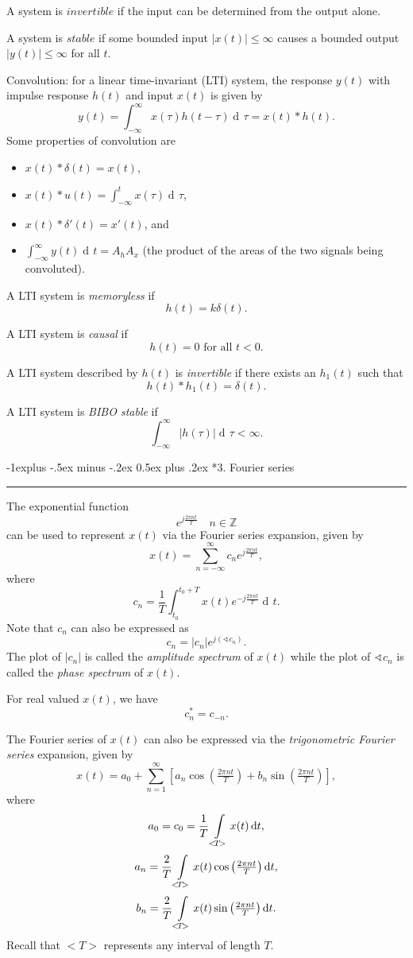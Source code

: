 \documentclass[10pt,letterpaper]{article}
\makeatletter
\DeclareMathOperator{\di}{d\!} %
\newcommand{\sumi}[1][1]{ \sum_{n={#1}}^{\infty} } %
\newcommand{\tpfrac}[2]{\left(\tfrac{#1}{#2}\right)} %
\newcommand{\abs}[1]{\left| #1 \right|} %
\newcommand{\sbracks}[1]{\left[ #1 \right]} %
\newcommand{\Z}{\mathbb{Z}}
\newcommand{\impulse}{ \delta(t) }
\newcommand{\Iint}{ \int_{-\infty}^{\infty} }
\newcommand{\Uint}{ \int\displaylimits_{<\!T\!>} }
\newcommand{\epos}{ e^{j\frac{2\pi nt}{T}} }
\newcommand{\eneg}{ e^{-j\frac{2\pi nt}{T}} }
\newcommand{\fatcos}{ \cos\tpfrac{2\pi nt}{T} }
\newcommand{\fatsin}{ \sin\tpfrac{2\pi nt}{T} }
\newcommand{\underlineSection}[1][unnamed]{
\subsection*{#1}
\hrule
\vspace{12pt}
}
\renewcommand{\subsection}{\@startsection{subsection}{2}{0mm}%
                                {-1explus -.5ex minus -.2ex}%
                                {0.5ex plus .2ex}%
                                {\normalfont\normalsize\bfseries}}
\makeatother
\begin{document}
\begin{multicols*}{3}
A system is $invertible$ if the input can be determined from the output alone.

A system is $stable$ if some bounded input $\abs{x(t)} \leq \infty$ causes a bounded output $\abs{y(t)} \leq \infty$ for all $t$.

Convolution: for a linear time-invariant (LTI) system, the response $y(t)$ with impulse response $h(t)$ and input $x(t)$ is given by
\[ y(t) = \Iint x(\tau) h(t-\tau) \di \tau = x(t)*h(t). \]
Some properties of convolution are
\begin{itemize}[leftmargin=0.5cm]
\item $x(t)*\impulse = x(t)$,
\item $\displaystyle x(t)*u(t) = \int_{-\infty}^t x(\tau) \di\tau$,
\item $x(t)*\delta'(t) = x'(t)$, and
\item $\displaystyle \Iint y(t) \di t = A_h A_x$ (the product of the areas of the two signals being convoluted).
\end{itemize}

A LTI system is \textit{memoryless} if
\[ h(t) = k\impulse. \]

A LTI system is \textit{causal} if
\[ h(t) = 0 \text{ for all } t < 0. \]

A LTI system described by $h(t)$ is \textit{invertible} if there exists an $h_1(t)$ such that
\[ h(t)*h_1(t) = \impulse. \]

A LTI system is \textit{BIBO stable} if
\[ \Iint \abs{h(\tau)} \di\tau < \infty. \]

\underlineSection[3. Fourier series]
The exponential function
\[ \epos \quad n \in \Z \]
can be used to represent $x(t)$ via the Fourier series expansion, given by
\[ x(t) = \sumi[-\infty] c_n \epos, \]
where
\[ c_n = \dfrac{1}{T} \int_{t_0}^{t_0 + T} x(t) \eneg \di t. \]
Note that $c_n$ can also be expressed as
\[ c_n = |c_n|e^{j(\sphericalangle c_n)}. \]
The plot of $|c_n|$ is called the \textit{amplitude spectrum} of $x(t)$ while the plot of $\sphericalangle c_n$ is called the \textit{phase spectrum} of $x(t)$.

For real valued $x(t)$, we have
\[ c_n^* = c_{-n}. \]

The Fourier series of $x(t)$ can also be expressed via the \textit{trigonometric Fourier series} expansion, given by
\[ x(t) = a_0 + \sumi \sbracks{ a_n \fatcos + b_n \fatsin }, \]
where
\[ a_0 = c_0 = \dfrac{1}{T} \Uint x(t) \di t, \]
\[ a_n = \dfrac{2}{T} \Uint x(t) \fatcos \di t, \]
\[ b_n = \dfrac{2}{T} \Uint x(t) \fatsin \di t. \]
Recall that $< \!\!\! T \!\!\! >$ represents any interval of length $T$.


\end{multicols*}
\end{document}
